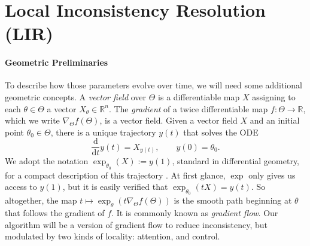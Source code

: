 \section{Local Inconsistency Resolution (LIR)}

\paragraph{Geometric Preliminaries}
To describe how those parameters evolve over time, we will need some additional geometric concepts.
A \emph{vector field} over $\Theta$ is a differentiable
    map $X$ assigning to each $\theta \in \Theta$ a vector $X_\theta \in \mathbb R^n$.
The \emph{gradient} of a twice differentiable map $f : \Theta \to \mathbb R$,
    which we write $\nabla_\Theta f(\Theta)$, is a vector field.
Given a vector field  $X$ and an initial point $\theta_0 \in \Theta$, there is a unique trajectory $y(t)$ that solves the ODE
\[
\frac{\mathrm d }{\mathrm d t}y(t) = X_{y(t)}
,\qquad
y(0) = \theta_0.
\]
We adopt the notation $\exp_{\theta_0}( X ) := y(1)$,
    standard in differential geometry,
    for a compact description of 
    this trajectory
    \citep{lee.smooth-manifolds}.
At first glance,
$\exp$ only gives us access to $y(1)$,
    but
     it is easily verified
     that $\exp_{\theta_0}(t X) = y(t)$.
So altogether, the map $t\mapsto \exp_\theta(t \nabla_\Theta f(\Theta))$ is the smooth path beginning at $\theta$ that follows the gradient of $f$. It is commonly known as \emph{gradient flow}.
Our algorithm will be a version of gradient flow to reduce inconsistency, but modulated by two kinds of locality: attention, and control. 

